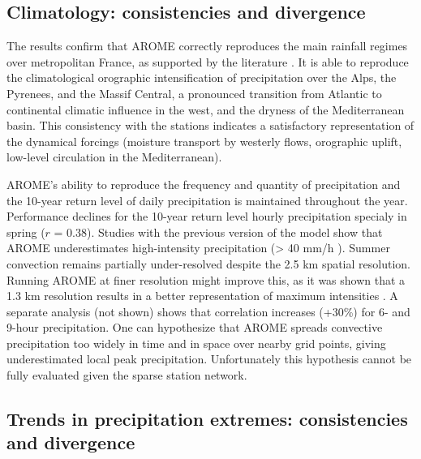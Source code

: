 \documentclass[french,a4paper,DIV=11,numbers=noendperiod]{scrartcl}
\begin{document}
\subsection{Climatology: consistencies and divergence}\label{climatology-consistencies-divergence-and-limitations}

The results confirm that AROME correctly reproduces the main rainfall
regimes over metropolitan France, as supported by the literature \parencites{Fumiere2020,Caillaud2021,hess-28-2579-2024,LucasPicher2024,Cortes-Hernandez2024}. It is able to reproduce the climatological orographic intensification of precipitation over the Alps,
the Pyrenees, and the Massif Central, a pronounced transition from Atlantic to continental climatic influence in the west, and the dryness of the Mediterranean
basin. This consistency with the stations indicates a satisfactory
representation of the dynamical forcings (moisture transport by westerly
flows, orographic uplift, low-level circulation in the Mediterranean).

AROME's ability to reproduce the frequency and quantity of precipitation and the 10-year return level of daily precipitation
is maintained throughout the year. Performance declines for the
10-year return level hourly precipitation specialy in spring ($r$ = 0.38).
Studies with the previous version of the model show that AROME underestimates high-intensity precipitation (\textgreater{} 40
mm/h \parencite{Caillaud2021,poncet2024convection}). Summer
convection remains partially under-resolved despite the 2.5 km spatial
resolution. Running AROME at finer resolution might improve this, as it was shown that a 1.3 km resolution results in a better representation of maximum intensities \parencite{brousseau-etal-2016}. A separate analysis (not shown) shows that
correlation increases (+30\%) for 6- and 9-hour precipitation.
One can hypothesize that AROME spreads convective precipitation too widely in time and in space over nearby grid points, giving underestimated local peak precipitation. Unfortunately this hypothesis cannot be fully evaluated given the sparse station network. 


\subsection{Trends in precipitation extremes: consistencies and
divergence}\label{trends-in-precipitation-extremes-consistencies-divergences-and-limitations}
\end{document}
